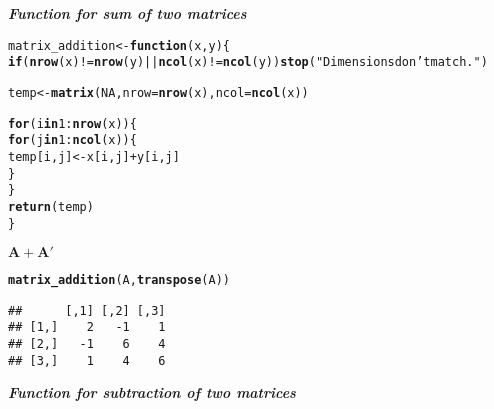 \documentclass[11pt, a4paper]{article}\usepackage[]{graphicx}\usepackage[]{xcolor}
\makeatletter
\newcommand{\hlnum}[1]{\textcolor[rgb]{0.686,0.059,0.569}{#1}}%
\newcommand{\hlsng}[1]{\textcolor[rgb]{0.192,0.494,0.8}{#1}}%
\newcommand{\hlopt}[1]{\textcolor[rgb]{0,0,0}{#1}}%
\newcommand{\hldef}[1]{\textcolor[rgb]{0.345,0.345,0.345}{#1}}%
\newcommand{\hlkwa}[1]{\textcolor[rgb]{0.161,0.373,0.58}{\textbf{#1}}}%
\newcommand{\hlkwb}[1]{\textcolor[rgb]{0.69,0.353,0.396}{#1}}%
\newcommand{\hlkwc}[1]{\textcolor[rgb]{0.333,0.667,0.333}{#1}}%
\newcommand{\hlkwd}[1]{\textcolor[rgb]{0.737,0.353,0.396}{\textbf{#1}}}%
\newenvironment{kframe}{%
 \def\at@end@of@kframe{}%
 \ifinner\ifhmode%
  \def\at@end@of@kframe{\end{minipage}}%
  \begin{minipage}{\columnwidth}%
 \fi\fi%
 \def\FrameCommand##1{\hskip\@totalleftmargin \hskip-\fboxsep
 \colorbox{shadecolor}{##1}\hskip-\fboxsep
     \hskip-\linewidth \hskip-\@totalleftmargin \hskip\columnwidth}%
 \MakeFramed {\advance\hsize-\width
   \@totalleftmargin\z@ \linewidth\hsize
   \@setminipage}}%
 {\par\unskip\endMakeFramed%
 \at@end@of@kframe}
\newenvironment{knitrout}{}{} %
\makeatother
\begin{document}
\faArrowAltCircleRight[regular] \textit{\textbf{Function for sum of two matrices}}

\begin{knitrout}
\color{fgcolor}\begin{kframe}
\begin{alltt}
\hldef{matrix_addition} \hlkwb{<-} \hlkwa{function}\hldef{(}\hlkwc{x}\hldef{,} \hlkwc{y}\hldef{)\{}
  \hlkwa{if}\hldef{(}\hlkwd{nrow}\hldef{(x)} \hlopt{!=} \hlkwd{nrow}\hldef{(y)} \hlopt{||} \hlkwd{ncol}\hldef{(x)} \hlopt{!=} \hlkwd{ncol}\hldef{(y))} \hlkwd{stop}\hldef{(}\hlsng{"Dimensions don't match."}\hldef{)}

  \hldef{temp} \hlkwb{<-} \hlkwd{matrix}\hldef{(}\hlnum{NA}\hldef{,} \hlkwc{nrow} \hldef{=} \hlkwd{nrow}\hldef{(x),} \hlkwc{ncol} \hldef{=} \hlkwd{ncol}\hldef{(x))}

  \hlkwa{for} \hldef{(i} \hlkwa{in} \hlnum{1}\hlopt{:}\hlkwd{nrow}\hldef{(x)) \{}
    \hlkwa{for} \hldef{(j} \hlkwa{in} \hlnum{1}\hlopt{:}\hlkwd{ncol}\hldef{(x)) \{}
      \hldef{temp[i, j]} \hlkwb{<-} \hldef{x[i, j]} \hlopt{+} \hldef{y[i, j]}
    \hldef{\}}
  \hldef{\}}
  \hlkwd{return}\hldef{(temp)}
\hldef{\}}
\end{alltt}
\end{kframe}
\end{knitrout}

\faArrowAltCircleRight[regular] $\mathbf{A + A'}$

\begin{knitrout}
\color{fgcolor}\begin{kframe}
\begin{alltt}
\hlkwd{matrix_addition}\hldef{(A,} \hlkwd{transpose}\hldef{(A))}
\end{alltt}
\begin{verbatim}
##      [,1] [,2] [,3]
## [1,]    2   -1    1
## [2,]   -1    6    4
## [3,]    1    4    6
\end{verbatim}
\end{kframe}
\end{knitrout}

\faArrowAltCircleRight[regular] \textit{\textbf{Function for subtraction of two matrices}}
\end{document}
